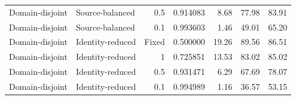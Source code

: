 \documentclass[10pt]{article}
\newenvironment{bluechange}{\color{black}}{}
\begin{document}
\begin{bluechange}
\begin{longtable}{llrrrrr}
Domain-disjoint & Source-balanced & 0.5 & 0.914083 & 8.68 & 77.98 & 83.91 \\
Domain-disjoint & Source-balanced & 0.1 & 0.993603 & 1.46 & 49.01 & 65.20 \\
Domain-disjoint & Identity-reduced & Fixed & 0.500000 & 19.26 & 89.56 & 86.51 \\
Domain-disjoint & Identity-reduced & 1 & 0.725851 & 13.53 & 83.02 & 85.02 \\
Domain-disjoint & Identity-reduced & 0.5 & 0.931471 & 6.29 & 67.69 & 78.07 \\
Domain-disjoint & Identity-reduced & 0.1 & 0.994989 & 1.16 & 36.57 & 53.15 \\
\bottomrule
\end{longtable}
\end{bluechange}
\end{document}
